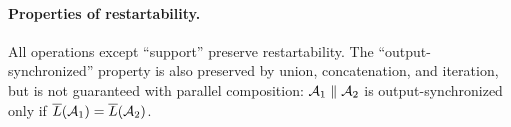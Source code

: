 \begin{figure*}[h]

\label{fig:iteration}
\end{figure*}

\paragraph*{Properties of restartability.}
All operations except ``support'' preserve restartability.
The ``output-synchronized'' property is also preserved by union, concatenation, and iteration, but is not guaranteed with parallel composition: $\mathcal{A}_1 \; \| \; \mathcal{A}_2$ is output-synchronized only if $\overline{L}(\mathcal{A}_1) = \overline{L}(\mathcal{A}_2)$.

